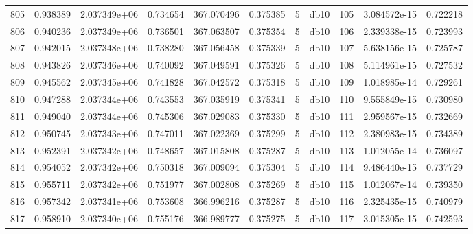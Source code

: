 \begin{tabular}{lrrrrrrlrrr}
805  &    0.938389 &        2.037349e+06 &  0.734654 &              367.070496 &    0.375385 &       5 &         db10 &    105 &   3.084572e-15 &      0.722218 \\
806  &    0.940236 &        2.037349e+06 &  0.736501 &              367.063507 &    0.375354 &       5 &         db10 &    106 &   2.339338e-15 &      0.723993 \\
807  &    0.942015 &        2.037348e+06 &  0.738280 &              367.056458 &    0.375339 &       5 &         db10 &    107 &   5.638156e-15 &      0.725787 \\
808  &    0.943826 &        2.037346e+06 &  0.740092 &              367.049591 &    0.375326 &       5 &         db10 &    108 &   5.114961e-15 &      0.727532 \\
809  &    0.945562 &        2.037345e+06 &  0.741828 &              367.042572 &    0.375318 &       5 &         db10 &    109 &   1.018985e-14 &      0.729261 \\
810  &    0.947288 &        2.037344e+06 &  0.743553 &              367.035919 &    0.375341 &       5 &         db10 &    110 &   9.555849e-15 &      0.730980 \\
811  &    0.949040 &        2.037344e+06 &  0.745306 &              367.029083 &    0.375330 &       5 &         db10 &    111 &   2.959567e-15 &      0.732669 \\
812  &    0.950745 &        2.037343e+06 &  0.747011 &              367.022369 &    0.375299 &       5 &         db10 &    112 &   2.380983e-15 &      0.734389 \\
813  &    0.952391 &        2.037342e+06 &  0.748657 &              367.015808 &    0.375287 &       5 &         db10 &    113 &   1.012055e-14 &      0.736097 \\
814  &    0.954052 &        2.037342e+06 &  0.750318 &              367.009094 &    0.375304 &       5 &         db10 &    114 &   9.486440e-15 &      0.737729 \\
815  &    0.955711 &        2.037342e+06 &  0.751977 &              367.002808 &    0.375269 &       5 &         db10 &    115 &   1.012067e-14 &      0.739350 \\
816  &    0.957342 &        2.037341e+06 &  0.753608 &              366.996216 &    0.375287 &       5 &         db10 &    116 &   2.325435e-15 &      0.740979 \\
817  &    0.958910 &        2.037340e+06 &  0.755176 &              366.989777 &    0.375275 &       5 &         db10 &    117 &   3.015305e-15 &      0.742593 \\

\end{tabular}

